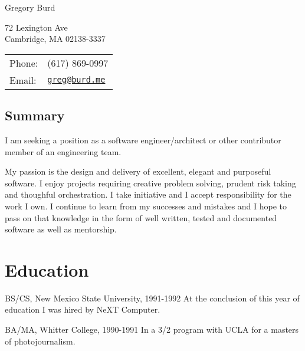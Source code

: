\documentclass[letterpaper]{article}
\def\name{Gregory Burd}
\renewenvironment{itemize}{
  \begin{list}{}{
    \setlength{\leftmargin}{1.5em}
  }
}{
  \end{list}
}
\begin{document}
{\huge \name}


\vspace{0.25in}

\begin{minipage}{0.45\linewidth}
  72 Lexington Ave \\
  Cambridge, MA 02138-3337
\end{minipage}
\begin{minipage}{0.45\linewidth}
  \begin{tabular}{ll}
    Phone: & (617) 869-0997 \\
    Email: & \href{mailto:greg@burd.me}{\tt greg@burd.me} \\
  \end{tabular}
\end{minipage}

\vspace{0.25in}

\subsection*{Summary}

\begin{itemize}

\item I am seeking a position as a software engineer/architect or other
  contributor member of an engineering team.

\item My passion is the design and delivery of excellent, elegant and
  purposeful software. I enjoy projects requiring creative problem solving,
  prudent risk taking and thoughful orchestration. I take initiative and I
  accept responsibility for the work I own. I continue to learn from my
  successes and mistakes and I hope to pass on that knowledge in the form
  of well written, tested and documented software as well as mentorship.

\end{itemize}


\section*{Education}

\begin{itemize}
  \item BS/CS, New Mexico State University, 1991-1992
    At the conclusion of this year of education I was hired by NeXT Computer.

  \item BA/MA, Whitter College, 1990-1991
    In a 3/2 program with UCLA for a masters of photojournalism.
\end{itemize}
\end{document}
